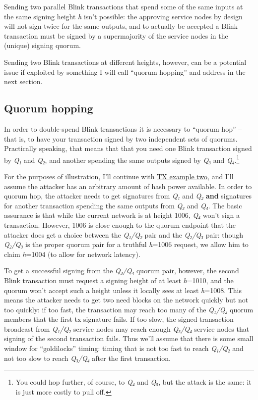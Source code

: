 Sending two parallel Blink transactions that spend some of the same
inputs at the same signing height \emph{h} isn't possible: the approving
service nodes by design will not sign twice for the same outputs, and to
actually be accepted a Blink transaction must be signed by a
supermajority of the service nodes in the (unique) signing quorum.

Sending two Blink transactions at different heights, however, can be a
potential issue if exploited by something I will call ``quorum hopping''
and address in the next section.

\hypertarget{quorum-hopping}{%
\subsection{Quorum hopping}\label{quorum-hopping}}

In order to double-spend Blink transactions it is necessary to ``quorum
hop'' -- that is, to have your transaction signed by two independent
sets of quorums. Practically speaking, that means that that you need one
Blink transaction signed by \emph{Q₁} and \emph{Q₂}, and another
spending the same outputs signed by \emph{Q₃} and \emph{Q₄}.\footnote{You
  could hop further, of course, to \emph{Q₄} and \emph{Q₅}, but the
  attack is the same: it is just more costly to pull off.}

For the purposes of illustration, I'll continue with
\protect\hyperlink{tx-example-two}{TX example two}, and I'll assume the
attacker has an arbitrary amount of hash power available. In order to
quorum hop, the attacker needs to get signatures from \emph{Q₁} and
\emph{Q₂} \textbf{and} signatures for another transaction spending the
same outputs from \emph{Q₃} and \emph{Q₄}. The basic assurance is that
while the current network is at height 1006, \emph{Q₄} won't sign a
transaction. However, 1006 is close enough to the quorum endpoint that
the attacker does get a choice between the \emph{Q₁/Q₂} pair and the
\emph{Q₂/Q₃} pair: though \emph{Q₂/Q₃} is the proper quorum pair for a
truthful \emph{h}=1006 request, we allow him to claim \emph{h}=1004 (to
allow for network latency).

To get a successful signing from the \emph{Q₃/Q₄} quorum pair, however,
the second Blink transaction must request a signing height of at least
\emph{h}=1010, and the quorum won't accept such a height unless it
locally sees at least \emph{h}=1008. This means the attacker needs to
get two need blocks on the network quickly but not too quickly: if too
fast, the transaction may reach too many of the \emph{Q₁/Q₂} quorum
members that the first tx signature fails. If too slow, the signed
transaction broadcast from \emph{Q₁/Q₂} service nodes may reach enough
\emph{Q₃/Q₄} service nodes that signing of the second transaction fails.
Thus we'll assume that there is some small window for ``goldilocks''
timing: timing that is not too fast to reach \emph{Q₁/Q₂} and not too
slow to reach \emph{Q₃/Q₄} after the first transaction.

